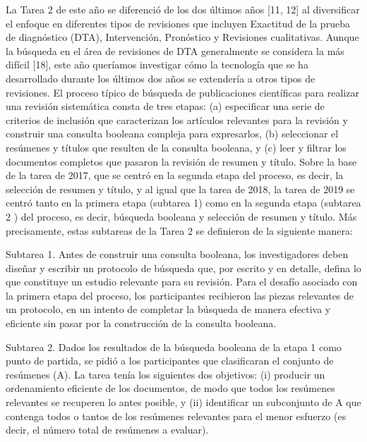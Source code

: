 La Tarea 2 de este año se diferenció de los dos últimos años [11, 12] al diversificar el enfoque en diferentes tipos de revisiones que incluyen Exactitud de la prueba de diagnóstico (DTA), Intervención, Pronóstico y Revisiones cualitativas. Aunque la búsqueda en el área de revisiones de DTA generalmente se considera la más difícil [18], este año queríamos investigar cómo la tecnología que se ha desarrollado durante los últimos dos años se extendería a otros tipos de revisiones. El proceso típico de búsqueda de publicaciones científicas para realizar una revisión sistemática consta de tres etapas: (a) especificar una serie de criterios de inclusión que caracterizan los artículos relevantes para la revisión y construir una consulta booleana compleja para expresarlos, (b) seleccionar el resúmenes y títulos que resulten de la consulta booleana, y (c) leer y filtrar los documentos completos que pasaron la revisión de resumen y título. Sobre la base de la tarea de 2017, que se centró en la segunda etapa del proceso, es decir, la selección de resumen y título, y al igual que la tarea de 2018, la tarea de 2019 se centró tanto en la primera etapa (subtarea 1) como en la segunda etapa (subtarea 2 ) del proceso, es decir, búsqueda booleana y selección de resumen y título. Más precisamente, estas subtareas de la Tarea 2 se definieron de la siguiente manera:

Subtarea 1. Antes de construir una consulta booleana, los investigadores deben diseñar y escribir un protocolo de búsqueda que, por escrito y en detalle, defina lo que constituye un estudio relevante para su revisión. Para el desafío asociado con la primera etapa del proceso, los participantes recibieron las piezas relevantes de un protocolo, en un intento de completar la búsqueda de manera efectiva y eficiente sin pasar por la construcción de la consulta booleana.

Subtarea 2. Dados los resultados de la búsqueda booleana de la etapa 1 como punto de partida, se pidió a los participantes que clasificaran el conjunto de resúmenes (A). La tarea tenía los siguientes dos objetivos: (i) producir un ordenamiento eficiente de los documentos, de modo que todos los resúmenes relevantes se recuperen lo antes posible, y (ii) identificar un subconjunto de A que contenga todos o tantos de los resúmenes relevantes para el menor esfuerzo (es decir, el número total de resúmenes a evaluar).

